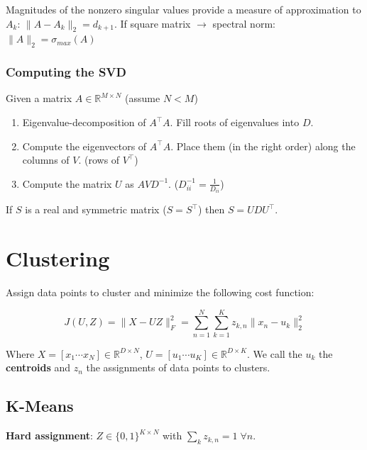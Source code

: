 \documentclass[a4paper,landscape,10pt]{article}
\newlength{\wideitemsep}
\let\olditem\item
\renewcommand{\item}{\setlength{\itemsep}{\wideitemsep}\olditem}
\newcommand{\R}[0]
{
    \mathbb{R}%
}
\begin{document}
\begin{multicols}{4}
Magnitudes of the nonzero singular values provide a measure of approximation to
$A_k$: $\|A - A_k\|_2 = d_{k+1}$.
If square matrix $\rightarrow$ spectral norm: $\|A\|_2 = \sigma_{max}(A)$

\subsubsection{Computing the SVD}
Given a matrix $A \in \R^{M \times N}$ (assume $N < M$)
\begin{enumerate}
    \item Eigenvalue-decomposition of $A^\top A$. Fill roots of eigenvalues into
    $D$.
    \item Compute the eigenvectors of $A^\top A$. Place them (in the right
    order) along the columns of $V$. (rows of $V^\top$)
    \item Compute the matrix $U$ as $AVD^{-1}$. ($D_{ii}^{-1} =
    \frac{1}{D_{ii}}$)
\end{enumerate}

If $S$ is a real and symmetric matrix ($S = S^\top$) then $S = UDU^\top$.


\section{Clustering}
Assign data points to cluster and minimize the following cost function:

\[
    J(U, Z) = \|X - UZ\|_F^2 = \sum_{n=1}^{N}\sum_{k=1}^K z_{k,n} \|x_n -
    u_k\|_2^2
\]

Where $X = [x_1 \cdots x_N] \in \R^{D \times N}$, $U = [u_1 \cdots u_K] \in
\R^{D \times K}$. We call the $u_k$ the {\bf centroids} and $z_n$ the
assignments of data points to clusters.

\subsection{K-Means}
{\bf Hard assignment}: $Z \in \{0,1\}^{K \times N}$ with $\sum_k z_{k,n} = 1 \;
\forall n$.


\end{multicols}
\end{document}
